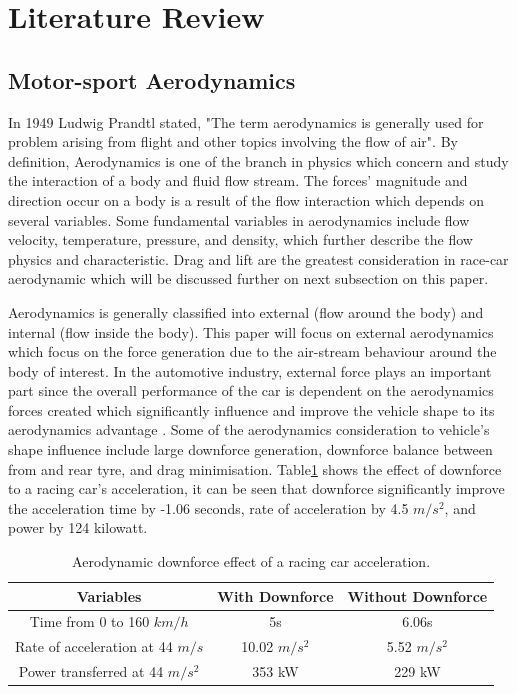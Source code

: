 \section{Literature Review}

\subsection{Motor-sport Aerodynamics}
In 1949 Ludwig Prandtl stated, "The term aerodynamics is generally used for problem arising from flight and other topics involving the flow of air\cite{Anderson2007FundamentalsJr.}". By definition, Aerodynamics is one of the branch in physics which concern and study the interaction of a body and fluid flow stream\cite{Scibor-Rylski1984RoadAerodynamics}. The forces' magnitude and direction occur on a body is a result of the flow interaction which depends on several variables. Some fundamental variables in aerodynamics include flow velocity, temperature, pressure, and density, which further describe the flow physics and characteristic. Drag and lift are the greatest consideration in race-car aerodynamic which will be discussed further on next subsection on this paper.

\noindent Aerodynamics is generally classified into external (flow around  the body) and internal (flow inside the body). This paper will focus on external aerodynamics which focus on the force generation due to the air-stream behaviour around the body of interest. In the automotive industry, external force plays an important part since the overall performance of the car is dependent on the aerodynamics forces created which significantly influence and improve the vehicle shape to its aerodynamics advantage \cite{Scibor-Rylski1984RoadAerodynamics}. Some of the aerodynamics consideration to vehicle's shape influence include large downforce generation, downforce balance between from and rear tyre, and drag minimisation. Table\ref{Table1} shows the effect of downforce to a racing car's acceleration, it can be seen that downforce significantly improve the acceleration time by -1.06 seconds, rate of acceleration by 4.5 $m/s^2$, and power by 124 kilowatt. 

\begin{table}[ht]
\caption{\label{Table1} Aerodynamic downforce effect of a racing car acceleration\cite{Scibor-Rylski1984RoadAerodynamics}.}
\begin{center}
 \begin{tabular}{||c| c c ||} 
 \hline
 Variables & With Downforce & Without Downforce \\ [0.5ex] 
 \hline\hline
 Time from 0 to 160 $km/h$ & 5s & 6.06s \\ 
 \hline
 Rate of acceleration at 44 $m/s$ & 10.02 $m/s^{2}$ & 5.52 $m/s^2$ \\
 \hline
 Power transferred at 44 $m/s^2$ & 353 kW & 229 kW  \\
 \hline
\end{tabular}
\end{center}
\end{table}

